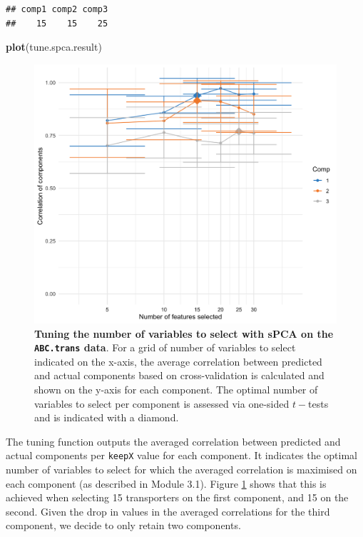 \documentclass[]{book}
\newenvironment{Shaded}{\begin{snugshade}}{\end{snugshade}}
\newcommand{\KeywordTok}[1]{\textcolor[rgb]{0.13,0.29,0.53}{\textbf{#1}}}
\newcommand{\NormalTok}[1]{#1}
\begin{document}
\begin{verbatim}
## comp1 comp2 comp3 
##    15    15    25
\end{verbatim}

\begin{Shaded}
\begin{Highlighting}[]
\KeywordTok{plot}\NormalTok{(tune.spca.result)}
\end{Highlighting}
\end{Shaded}

\begin{figure}

{\centering \includegraphics[width=0.5\linewidth]{Figures/PCA/spca-tuning-ABStrans-1} 

}

\caption{\textbf{Tuning the number of variables to
select with sPCA on the \texttt{ABC.trans} data}. For a grid of number
of variables to select indicated on the x-axis, the average correlation
between predicted and actual components based on cross-validation is
calculated and shown on the y-axis for each component. The optimal
number of variables to select per component is assessed via one-sided
\(t-\)tests and is indicated with a diamond.}\label{fig:spca-tuning-ABStrans}
\end{figure}









The tuning function outputs the averaged correlation between predicted
and actual components per \texttt{keepX} value for each component. It
indicates the optimal number of variables to select for which the
averaged correlation is maximised on each component (as described in
Module 3.1). Figure \ref{fig:spca-tuning-ABStrans} shows that this is
achieved when selecting 15 transporters on the first component, and 15
on the second. Given the drop in values in the averaged correlations for
the third component, we decide to only retain two components.
\end{document}
